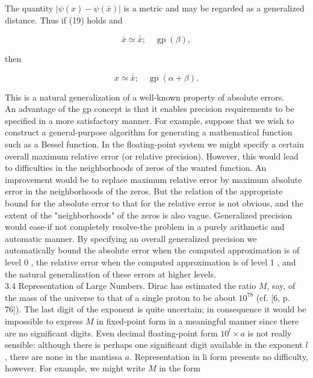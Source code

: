 \documentclass[10pt]{article}
\begin{document}
The quantity $|\psi(x)-\psi(\bar{x})|$ is a metric and may be regarded as a generalized distance. Thus if (19) holds and


\begin{equation*}
\bar{x} \simeq \overline{\bar{x}} ; \quad \operatorname{gp}(\beta), \tag{20}
\end{equation*}


then


\begin{equation*}
x \simeq \overline{\bar{x}} ; \quad \operatorname{gp}(\alpha+\beta) . \tag{21}
\end{equation*}


This is a natural generalization of a well-known property of absolute errors.\\
An advantage of the gp concept is that it enables precision requirements to be specified in a more satisfactory manner. For example, suppose that we wish to construct a general-purpose algorithm for generating a mathematical function such as a Bessel function. In the floating-point system we might specify a certain overall maximum relative error (or relative precision). However, this would lead to difficulties in the neighborhoods of zeros of the wanted function. An improvement would be to replace maximum relative error by maximum absolute error in the neighborhoods of the zeros. But the relation of the appropriate bound for the absolute error to that for the relative error is not obvious, and the extent of the "neighborhoods" of the zeros is also vague. Generalized precision would ease-if not completely resolve-the problem in a purely arithmetic and automatic manner. By specifying an overall generalized precision we automatically bound the absolute error when the computed approximation is of level 0 , the relative error when the computed approximation is of level 1 , and the natural generalization of these errors at higher levels.\\
3.4 Representation of Large Numbers. Dirac has estimated the ratio $M$, say, of the mass of the universe to that of a single proton to be about $10^{78}$ (cf. [6, p. 76]). The last digit of the exponent is quite uncertain; in consequence it would be impossible to express $M$ in fixed-point form in a meaningful manner since there are no significant digits. Even decimal floating-point form $10^{l} \times a$ is not really sensible: although there is perhaps one significant digit available in the exponent $l$, there are none in the mantissa $a$. Representation in li form presents no difficulty, however. For example, we might write $M$ in the form
\end{document}
